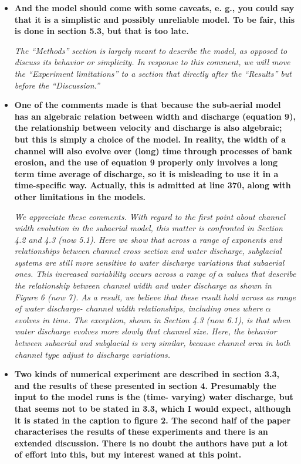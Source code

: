\documentclass[11pt]{article}
\begin{document}
\begin{itemize}
\item  \textbf{And the model should come with some caveats, e. g., you could say that it is a simplistic and possibly unreliable model. To be fair, this is done in section 5.3, but that is too late.}

  \textit{The ``Methods'' section is largely meant to describe the model, as opposed to discuss its behavior or simplicity. In response to this comment, we will move the ``Experiment limitations'' to a section that directly after the ``Results'' but before the ``Discussion.''}

  
\item \textbf{  One of the comments made is that because the sub-aerial model has an algebraic relation between width and discharge (equation 9), the relationship between velocity and discharge is also algebraic; but this is simply a choice of the model. In reality, the width of a channel will also evolve over (long) time through processes of bank erosion, and the use of equation 9 properly only involves a long term time average of discharge, so it is misleading to use it in a time-specific way. Actually, this is admitted at line 370, along with other limitations in the models.}


  \textit{We appreciate these comments. With regard to the first point about channel width evolution in the subaerial model, this matter is confronted in Section 4.2 and 4.3 (now 5.1).
    Here we show that across a range of exponents and relationships between channel cross section and water discharge, subglacial systems are still more sensitive to water discharge variations that subaerial ones.
    This increased variability occurs across a range of $\alpha$ values that describe the relationship between channel width and water discharge as shown in Figure 6 (now 7).
    As a result, we believe that these result hold across as range of water discharge- channel width relationships, including ones where $\alpha$ evolves in time.
    The exception, shown in Section 4.3 (now 6.1), is that when water discharge evolves more slowly that channel size. Here, the behavior between subaerial and subglacial is very similar, because channel area in both channel type adjust to discharge variations.}
  

\item   \textbf{Two kinds of numerical experiment are described in section 3.3, and the results of these presented in section 4. Presumably the input to the model runs is the (time- varying) water discharge, but that seems not to be stated in 3.3, which I would expect, although it is stated in the caption to figure 2.
    The second half of the paper characterises the results of these experiments and there is an extended discussion. There is no doubt the authors have put a lot of effort into this, but my interest waned at this point.}
 

\end{itemize}
\end{document}
